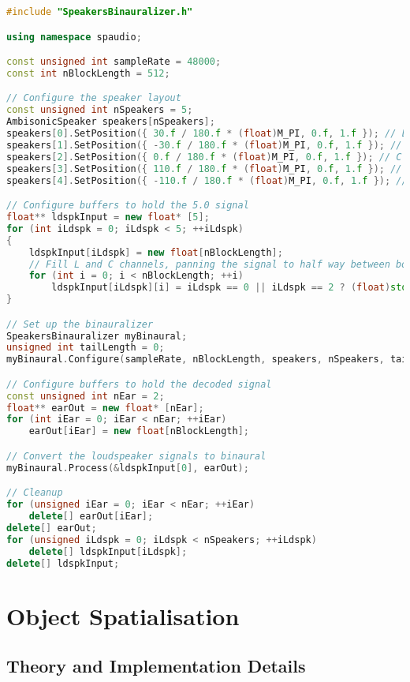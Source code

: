 \documentclass[12pt]{report}
\begin{document}
\begin{lstlisting}[language=C++]
#include "SpeakersBinauralizer.h"

using namespace spaudio;

const unsigned int sampleRate = 48000;
const int nBlockLength = 512;

// Configure the speaker layout
const unsigned int nSpeakers = 5;
AmbisonicSpeaker speakers[nSpeakers];
speakers[0].SetPosition({ 30.f / 180.f * (float)M_PI, 0.f, 1.f }); // L
speakers[1].SetPosition({ -30.f / 180.f * (float)M_PI, 0.f, 1.f }); // R
speakers[2].SetPosition({ 0.f / 180.f * (float)M_PI, 0.f, 1.f }); // C
speakers[3].SetPosition({ 110.f / 180.f * (float)M_PI, 0.f, 1.f }); // Ls
speakers[4].SetPosition({ -110.f / 180.f * (float)M_PI, 0.f, 1.f }); // Rs

// Configure buffers to hold the 5.0 signal
float** ldspkInput = new float* [5];
for (int iLdspk = 0; iLdspk < 5; ++iLdspk)
{
    ldspkInput[iLdspk] = new float[nBlockLength];
    // Fill L and C channels, panning the signal to half way between both speakers
    for (int i = 0; i < nBlockLength; ++i)
        ldspkInput[iLdspk][i] = iLdspk == 0 || iLdspk == 2 ? (float)std::sin((float)M_PI * 2.f * 440.f * (float)i / (float)sampleRate) : 0.f;
}

// Set up the binauralizer
SpeakersBinauralizer myBinaural;
unsigned int tailLength = 0;
myBinaural.Configure(sampleRate, nBlockLength, speakers, nSpeakers, tailLength);

// Configure buffers to hold the decoded signal
const unsigned int nEar = 2;
float** earOut = new float* [nEar];
for (int iEar = 0; iEar < nEar; ++iEar)
    earOut[iEar] = new float[nBlockLength];

// Convert the loudspeaker signals to binaural
myBinaural.Process(&ldspkInput[0], earOut);

// Cleanup
for (unsigned iEar = 0; iEar < nEar; ++iEar)
    delete[] earOut[iEar];
delete[] earOut;
for (unsigned iLdspk = 0; iLdspk < nSpeakers; ++iLdspk)
    delete[] ldspkInput[iLdspk];
delete[] ldspkInput;
\end{lstlisting}

\chapter{Object Spatialisation}\label{ObjectSpatialisation}

\section{Theory and Implementation Details}
\end{document}
